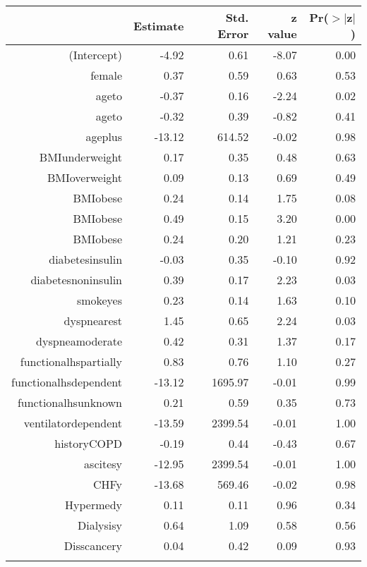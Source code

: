 
\bigskip\bigskip
\centering
\begin{tabular}{rrrrr}
  \hline
 & Estimate & Std. Error & z value & Pr($>$$|$z$|$) \\ 
  \hline
(Intercept) & -4.92 & 0.61 & -8.07 & 0.00 \\ 
  female & 0.37 & 0.59 & 0.63 & 0.53 \\ 
  age\-65\-to\-74 & -0.37 & 0.16 & -2.24 & 0.02 \\ 
  age\-75\-to\-84 & -0.32 & 0.39 & -0.82 & 0.41 \\ 
  age\-85\-plus & -13.12 & 614.52 & -0.02 & 0.98 \\ 
  BMI\-underweight & 0.17 & 0.35 & 0.48 & 0.63 \\ 
  BMI\-overweight & 0.09 & 0.13 & 0.69 & 0.49 \\ 
  BMI\-obese\-1 & 0.24 & 0.14 & 1.75 & 0.08 \\ 
  BMI\-obese\-2 & 0.49 & 0.15 & 3.20 & 0.00 \\ 
  BMI\-obese\-3 & 0.24 & 0.20 & 1.21 & 0.23 \\ 
  diabetes\-insulin & -0.03 & 0.35 & -0.10 & 0.92 \\ 
  diabetes\-noninsulin & 0.39 & 0.17 & 2.23 & 0.03 \\ 
  smoke\-yes & 0.23 & 0.14 & 1.63 & 0.10 \\ 
  dyspnea\-rest & 1.45 & 0.65 & 2.24 & 0.03 \\ 
  dyspnea\-moderate & 0.42 & 0.31 & 1.37 & 0.17 \\ 
  functional\-hs\-partially & 0.83 & 0.76 & 1.10 & 0.27 \\ 
  functional\-hs\-dependent & -13.12 & 1695.97 & -0.01 & 0.99 \\ 
  functional\-hs\-unknown & 0.21 & 0.59 & 0.35 & 0.73 \\ 
  ventilator\-dependent & -13.59 & 2399.54 & -0.01 & 1.00 \\ 
  history\-COPD & -0.19 & 0.44 & -0.43 & 0.67 \\ 
  ascites\-y & -12.95 & 2399.54 & -0.01 & 1.00 \\ 
  CHF\-y & -13.68 & 569.46 & -0.02 & 0.98 \\ 
  Hyper\-med\-y & 0.11 & 0.11 & 0.96 & 0.34 \\ 
  Dialysis\-y & 0.64 & 1.09 & 0.58 & 0.56 \\ 
  Diss\-cancer\-y & 0.04 & 0.42 & 0.09 & 0.93 \\ 
$$
\end{tabular}

